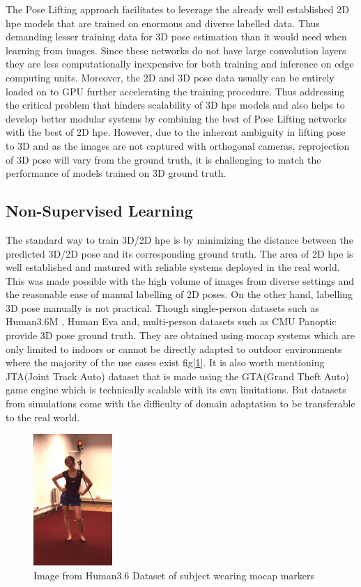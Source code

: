 The Pose Lifting approach facilitates to leverage the already well established 2D \ac{hpe} models that are trained on enormous and diverse labelled data. Thus demanding lesser training data for 3D pose estimation than it would need when learning from images. Since these networks do not have large convolution layers they are less computationally inexpensive for both training and inference on edge computing units. Moreover, the 2D and 3D pose data usually can be entirely loaded on to GPU further accelerating the training procedure. Thus addressing the critical problem that hinders scalability of 3D \ac{hpe} models and also helps to develop better modular systems by combining the best of Pose Lifting networks with the best of 2D \ac{hpe}. However, due to the inherent ambiguity in lifting pose to 3D and as the images are not captured with orthogonal cameras, reprojection of 3D pose will vary from the ground truth, it is challenging to match the performance of models trained on 3D ground truth.

\subsection{Non-Supervised Learning}

The standard way to train 3D/2D \ac{hpe} is by minimizing the distance between the predicted 3D/2D pose and its corresponding ground truth. The area of 2D \ac{hpe} is well established and matured with reliable systems deployed in the real world. This was made possible with the high volume of images from diverse settings and the reasonable ease of manual labelling of 2D poses. On the other hand, labelling 3D pose manually is not practical. Though single-person datasets such as Human3.6M \cite{H3.6}, Human Eva \cite{HumanEva} and, multi-person datasets such as CMU Panoptic \cite{cmuPanoptic} provide 3D pose ground truth. They are obtained using \ac{mocap} systems which are only limited to indoors or cannot be directly adapted to outdoor environments where the majority of the use cases exist fig[\ref{fig:h36_mocap}]. It is also worth mentioning JTA(Joint Track Auto) dataset \cite{JTA} that is made using the GTA(Grand Theft Auto) game engine which is technically scalable with its own limitations. But datasets from simulations come with the difficulty of domain adaptation to be transferable to the real world.

\begin{figure}[!h]
    \centering
    \includegraphics[width=30mm]{figures/h36_mocap.png}
    \caption{Image from Human3.6 Dataset \cite{H3.6} of subject wearing \ac{mocap} markers}
    \label{fig:h36_mocap}
\end{figure}

